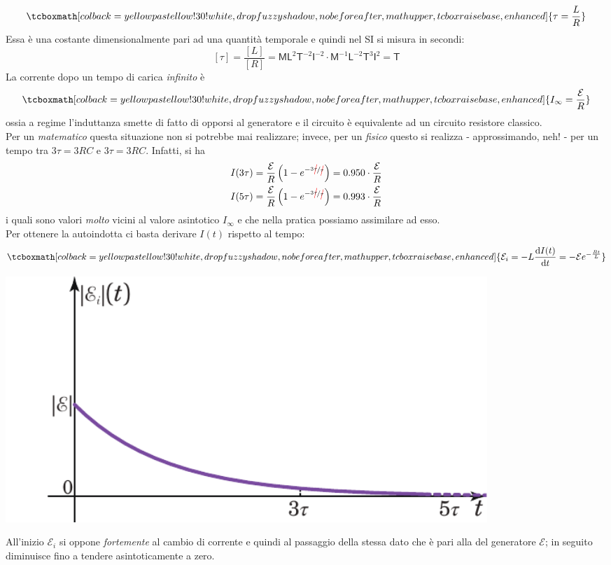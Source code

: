 \begin{equation}
	\tcboxmath[colback=yellowpastellow!30!white,drop fuzzy shadow, nobeforeafter, math upper, tcbox raise base, enhanced]{\tau=\frac{L}{R}}
\end{equation}
Essa è una costante dimensionalmente pari ad una quantità temporale e quindi nel SI si misura in secondi:
\begin{equation*}
	\left[\tau\right]=\frac{\left[L\right]}{\left[R\right]}=\mathsf{M} \mathsf{L}^2 \mathsf{T}^{-2} \mathsf{I}^{-2}\cdot \mathsf{M}^{-1} \mathsf{L}^{-2}  \mathsf{T}^3 \mathsf{I}^{2}=\mathsf{T}
\end{equation*}
La corrente dopo un tempo di carica \textit{infinito} è 
\begin{equation}
	\tcboxmath[colback=yellowpastellow!30!white,drop fuzzy shadow, nobeforeafter, math upper, tcbox raise base, enhanced]{I_{\infty}=\frac{\mathcal{E}}{R}}
\end{equation}
ossia a regime l'induttanza smette di fatto di opporsi al generatore e il circuito è equivalente ad un circuito resistore classico.\\
Per un \textit{matematico} questa situazione non si potrebbe mai realizzare; invece, per un \textit{fisico} questo si realizza - approssimando, neh! - per un tempo tra $3\tau=3RC$ e $3\tau=3RC$. Infatti, si ha
\begin{align*}
	I(3\tau)&=\frac{\mathcal{E}}{R}\left(1-e^{-\nicefrac{3\Ccancel[red]{\tau}}{\Ccancel[red]{\tau}}}\right)=\num{0.950}\cdot\frac{\mathcal{E}}{R}\\
	I(5\tau)&=\frac{\mathcal{E}}{R}\left(1-e^{-\nicefrac{3\Ccancel[red]{\tau}}{\Ccancel[red]{\tau}}}\right)=\num{0.993}\cdot\frac{\mathcal{E}}{R}
\end{align*}
i quali sono valori \textit{molto} vicini al valore asintotico $I_{\infty}$ e che nella pratica possiamo assimilare ad esso.\\
Per ottenere la \fem autoindotta ci basta derivare $I(t)$ rispetto al tempo:
\begin{equation}
	\tcboxmath[colback=yellowpastellow!30!white,drop fuzzy shadow, nobeforeafter, math upper, tcbox raise base, enhanced]{\mathcal{E}_i=-L\dv{I(t)}{t}=-\mathcal{E}e^{-\frac{Rt}{L}}}
\end{equation}
\begin{center}
	\includegraphics[width=0.8\textwidth]{images/chp10/chp10induttoregraf2.pdf}
\end{center}
All'inizio $\mathcal{E}_i$ si oppone \textit{fortemente} al cambio di corrente e quindi al passaggio della stessa dato che è pari alla \fem del generatore $\mathcal{E}$; in seguito diminuisce fino a tendere asintoticamente a zero.
